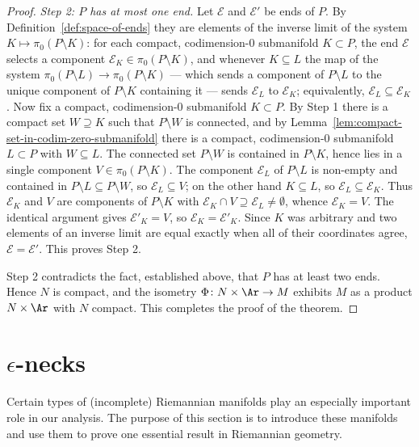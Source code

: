 \begin{proof}
\textit{Step 2: $P$ has at most one end.} Let ${\mathcal E}$ and
${\mathcal E}'$ be ends of $P$. By Definition~\ref{def:space-of-ends}
they are elements of the inverse limit of the system
$K\mapsto\pi_0(P\setminus K)$: for each compact, codimension-$0$
submanifold $K\subset P$, the end ${\mathcal E}$ selects a component
${\mathcal E}_K\in\pi_0(P\setminus K)$, and whenever $K\subseteq L$ the
map of the system $\pi_0(P\setminus L)\to\pi_0(P\setminus K)$ --- which
sends a component of $P\setminus L$ to the unique component of
$P\setminus K$ containing it --- sends ${\mathcal E}_L$ to
${\mathcal E}_K$; equivalently, ${\mathcal E}_L\subseteq{\mathcal E}_K$.
Now fix a compact, codimension-$0$ submanifold $K\subset P$. By Step 1
there is a compact set $W\supseteq K$ such that $P\setminus W$ is
connected, and by
Lemma~\ref{lem:compact-set-in-codim-zero-submanifold} there is a
compact, codimension-$0$ submanifold
$L\subset P$ with $W\subseteq L$. The connected set $P\setminus W$ is
contained in $P\setminus K$, hence lies in a single component
$V\in\pi_0(P\setminus K)$. The component ${\mathcal E}_L$ of
$P\setminus L$ is non-empty and contained in
$P\setminus L\subseteq P\setminus W$, so ${\mathcal E}_L\subseteq V$; on
the other hand $K\subseteq L$, so ${\mathcal E}_L\subseteq{\mathcal E}_K$.
Thus ${\mathcal E}_K$ and $V$ are components of $P\setminus K$ with
${\mathcal E}_K\cap V\supseteq{\mathcal E}_L\ne\emptyset$, whence
${\mathcal E}_K=V$. The identical argument gives ${\mathcal E}'_K=V$, so
${\mathcal E}_K={\mathcal E}'_K$. Since $K$ was arbitrary and two elements
of an inverse limit are equal exactly when all of their coordinates agree,
${\mathcal E}={\mathcal E}'$. This proves Step 2.

Step 2 contradicts the fact, established above, that $P$ has at least two
ends. Hence $N$ is compact, and the isometry $\Phi\colon N\times\Ar\to M$
exhibits $M$ as a product $N\times\Ar$ with $N$ compact. This completes
the proof of the theorem.
\end{proof}

\section{$\epsilon$-necks}

Certain types of (incomplete) Riemannian manifolds play an
especially important role in our analysis. The purpose of this
section is to introduce these manifolds and use them to prove one
essential result in Riemannian geometry.



